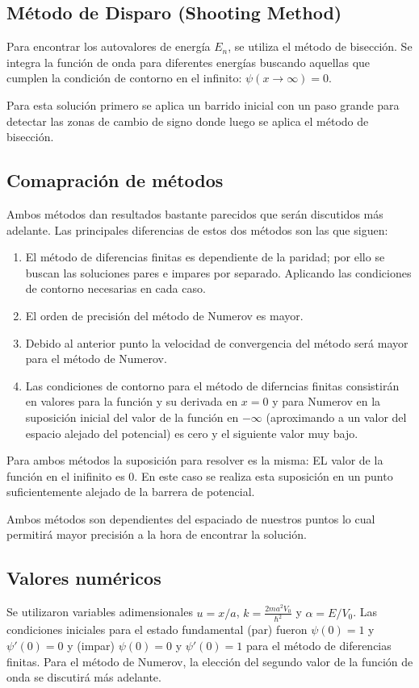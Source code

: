\documentclass[11pt,a4paper]{article}
\begin{document}
\subsection{Método de Disparo (Shooting Method)}
Para encontrar los autovalores de energía $E_n$, se utiliza el método de bisección. Se integra la función de onda para diferentes energías buscando aquellas que cumplen la condición de contorno en el infinito: $\psi(x \to \infty) = 0$.

Para esta solución primero se aplica un barrido inicial con un paso grande para detectar las zonas de cambio de signo donde luego se aplica el método de bisección.

\subsection{Comapración de métodos}

Ambos métodos dan resultados bastante parecidos que serán discutidos más adelante. Las principales diferencias de estos dos métodos son las que siguen:
\begin{enumerate}
    \item El método de diferencias finitas es dependiente de la paridad; por ello se buscan las soluciones pares e impares por separado. Aplicando las condiciones de contorno necesarias en cada caso.
    \item El orden de precisión del método de Numerov es mayor.
    \item Debido al anterior punto la velocidad de convergencia del método será mayor para el método de Numerov.
    \item Las condiciones de contorno para el método de diferncias finitas consistirán en valores para la función y su derivada en $x = 0$ y para Numerov en la suposición inicial del valor de la función en $-\infty$ (aproximando a un valor del espacio alejado del potencial) es cero y el siguiente valor muy bajo.
\end{enumerate}

Para ambos métodos la suposición para resolver es la misma: EL valor de la función en el inifinito es 0. En este caso se realiza esta suposición en un punto suficientemente alejado de la barrera de potencial.

Ambos métodos son dependientes del espaciado de nuestros puntos lo cual permitirá mayor precisión a la hora de encontrar la solución.

\subsection{Valores numéricos}
Se utilizaron variables adimensionales $u = x/a$, $k = \frac{2ma^2 V_0}{\hbar^2}$ y $\alpha = E/V_0$. Las condiciones iniciales para el estado fundamental (par) fueron $\psi(0)=1$ y $\psi'(0)=0$ y (impar) $\psi(0)=0$ y $\psi'(0)=1$ para el método de diferencias finitas. 
Para el método de Numerov, la elección del segundo valor de la función de onda se discutirá más adelante.
\end{document}
